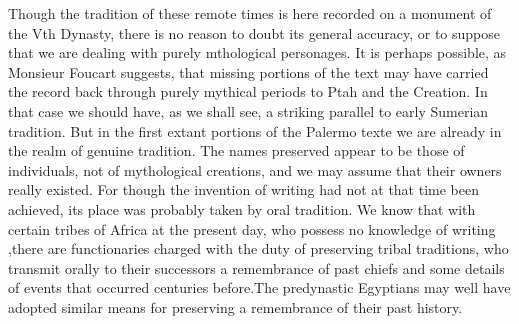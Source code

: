 \documentclass[12pt,oneside]{book}
\begin{document}


Though the tradition of these remote times is here recorded on a monument of the Vth Dynasty, there is no reason to doubt its general accuracy, or to suppose that we are dealing with purely mthological personages. It is perhaps possible, as Monsieur Foucart suggests, that missing portions of the text may have carried the record back through purely mythical periods to Ptah and the Creation. In that case we should have, as we shall see, a striking parallel to early Sumerian tradition. But in the first extant portions of the Palermo texte we are already in the realm of genuine tradition. The names preserved appear to be those of individuals, not of mythological creations, and we may assume that their owners really existed. For though the invention of writing had not at that time been achieved, its place was probably taken by oral tradition. We know that with certain tribes of Africa at the present day, who possess no knowledge of writing ,there are functionaries charged with the duty of preserving tribal traditions, who transmit orally to their successors a remembrance of past chiefs and some details of events that occurred centuries before.\footnotemark The predynastic Egyptians may well have adopted similar means for preserving a remembrance of their past history. \par 

\end{document}
